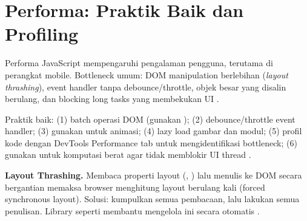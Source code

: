 \section{Performa: Praktik Baik dan Profiling}

Performa JavaScript mempengaruhi pengalaman pengguna, terutama di perangkat mobile. Bottleneck umum: DOM manipulation berlebihan (\textit{layout thrashing}), event handler tanpa debounce/throttle, objek besar yang disalin berulang, dan blocking long tasks yang membekukan UI \cite{mdnJsGuide}.

{\sloppy
Praktik baik: (1) batch operasi DOM (gunakan ); (2) debounce/throttle event handler; (3) gunakan  untuk animasi; (4) lazy load gambar dan modul; (5) profil kode dengan DevTools Performance tab untuk mengidentifikasi bottleneck; (6) gunakan  untuk komputasi berat agar tidak memblokir UI thread \cite{mdnToolsTesting}.
\par}

\begin{konsep}
\textbf{Layout Thrashing.} Membaca properti layout (, ) lalu menulis ke DOM secara bergantian memaksa browser menghitung layout berulang kali (forced synchronous layout). Solusi: kumpulkan semua pembacaan, lalu lakukan semua penulisan. Library seperti  membantu mengelola ini secara otomatis \cite{mdnJsGuide}.
\end{konsep}

